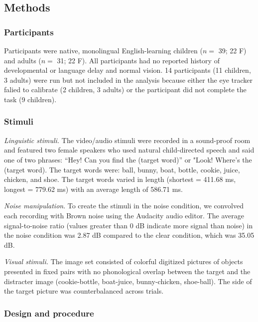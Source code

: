 \documentclass[english,floatsintext,man]{apa6}
\begin{document}
\hypertarget{methods-2}{%
\subsection{Methods}\label{methods-2}}

\hypertarget{participants-2}{%
\subsubsection{Participants}\label{participants-2}}

Participants were native, monolingual English-learning children (\(n=\)
39; 22 F) and adults (\(n=\) 31; 22 F). All participants had no reported
history of developmental or language delay and normal vision. 14
participants (11 children, 3 adults) were run but not included in the
analysis because either the eye tracker falied to calibrate (2 children,
3 adults) or the participant did not complete the task (9 children).

\hypertarget{stimuli-2}{%
\subsubsection{Stimuli}\label{stimuli-2}}

\emph{Linguistic stimuli.} The video/audio stimuli were recorded in a
sound-proof room and featured two female speakers who used natural
child-directed speech and said one of two phrases: \enquote{Hey! Can you
find the (target word)} or "Look! Where's the (target word). The target
words were: ball, bunny, boat, bottle, cookie, juice, chicken, and shoe.
The target words varied in length (shortest = 411.68 ms, longest =
779.62 ms) with an average length of 586.71 ms.

\emph{Noise manipulation}. To create the stimuli in the noise condition,
we convolved each recording with Brown noise using the Audacity audio
editor. The average signal-to-noise ratio (values greater than 0 dB
indicate more signal than noise) in the noise condition was 2.87 dB
compared to the clear condition, which was 35.05 dB.

\emph{Visual stimuli.} The image set consisted of colorful digitized
pictures of objects presented in fixed pairs with no phonological
overlap between the target and the distracter image (cookie-bottle,
boat-juice, bunny-chicken, shoe-ball). The side of the target picture
was counterbalanced across trials.

\hypertarget{design-and-procedure-2}{%
\subsubsection{Design and procedure}\label{design-and-procedure-2}}
\end{document}

